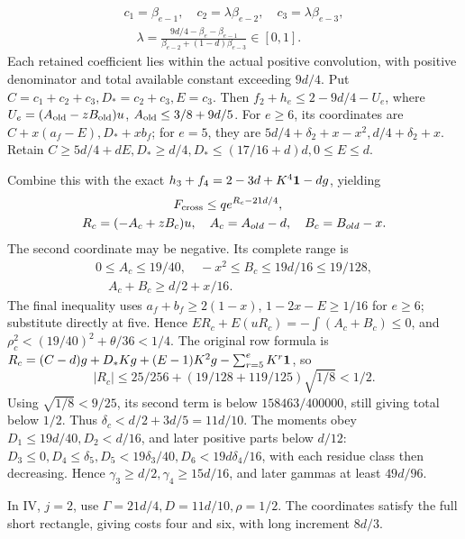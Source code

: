 \[
\begin{gathered}
c_1=\beta_{e-1},\quad c_2=\lambda\beta_{e-2},\quad c_3=\lambda\beta_{e-3},\\
\quad\lambda=\frac{9d/4-\beta_e-\beta_{e-1}}{\beta_{e-2}+(1-d)\beta_{e-3}}\in[0,1].
\end{gathered}
\]
Each retained coefficient lies within the actual positive convolution, with positive denominator and total available constant exceeding \(9d/4\). Put \(C=c_1+c_2+c_3,\allowbreak \allowbreak  D_*=c_2+c_3,\allowbreak \allowbreak  E=c_3\). Then \(f_2+h_e\le2-9d/4-U_e\), where \(U_e=(A_{\rm old}-zB_{\rm old})u\), \(A_{\rm old}\le3/8+9d/5\). For \(e\ge6\), its coordinates are \(C+x(a_f-E),\allowbreak \allowbreak  D_*+xb_f\); for \(e=5\), they are \(5d/4+\delta_2+x-x^2,\allowbreak \allowbreak  d/4+\delta_2+x\). Retain \(C\ge5d/4+dE,\allowbreak \allowbreak  D_*\ge d/4,\allowbreak \allowbreak  D_*\le(17/16+d)d,\allowbreak \allowbreak  0\le E\le d\).

Combine this with the exact \(h_3+f_4=2-3d+K^4\mathbf1-dg\), yielding
\[
\begin{gathered}
F_{\rm cross}\le qe^{R_c-21d/4},\quad\\
R_c=(-A_c+zB_c)u,\quad A_c=A_{old}-d,\quad B_c=B_{old}-x.
\end{gathered}
\]
The second coordinate may be negative. Its complete range is
\[
\begin{gathered}
0\le A_c\le19/40,\quad -x^2\le B_c\le19d/16\le19/128,\\
\quad A_c+B_c\ge d/2+x/16.
\end{gathered}\tag{C177.T184.26}
\]
The final inequality uses \(a_f+b_f\ge2(1-x)\), \(1-2x-E\ge1/16\) for \(e\ge6\); substitute directly at five. Hence \(ER_c+E(uR_c)=-\int(A_c+B_c)\le0\), and \(\rho_c^2<(19/40)^2+\theta/36<1/4\). The original row formula is \(R_c=(C-d)g+D_*Kg+(E-1)K^2g-\sum_{r=5}^eK^r\mathbf1\), so
\[
|R_c|\le25/256+(19/128+119/125)\sqrt{1/8}<1/2.
\]
Using \(\sqrt{1/8}<9/25\), its second term is below \(158463/400000\), still giving total below \(1/2\). Thus \( \delta_c<d/2+3d/5=11d/10\). The moments obey \(D_1\le19d/40,\allowbreak \allowbreak  D_2<d/16\), and later positive parts below \(d/12\): \(D_3\le0,\allowbreak \allowbreak  D_4\le \delta_5,\allowbreak \allowbreak  D_5<19\delta_3/40,\allowbreak \allowbreak  D_6<19d\delta_4/16\), with each residue class then decreasing. Hence \(\gamma_3\ge d/2,\allowbreak \allowbreak  \gamma_4\ge15d/16\), and later gammas at least \(49d/96\).

In IV, \(j=2\), use \(\Gamma=21d/4,\allowbreak \allowbreak  D=11d/10,\allowbreak \allowbreak  \rho=1/2\). The coordinates satisfy the full short rectangle, giving costs four and six, with long increment \(8d/3\).

